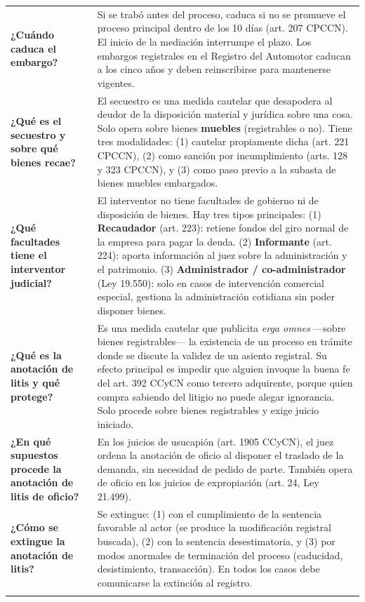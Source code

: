 \documentclass[12pt,oneside]{book}
\begin{document}
\begin{longtable}{p{} p{}}
\textbf{¿Cuándo caduca el embargo?} &
Si se trabó antes del proceso, caduca si no se promueve el proceso principal dentro de los 10 días (art. 207 CPCCN). El inicio de la mediación interrumpe el plazo. Los embargos registrales en el Registro del Automotor caducan a los cinco años y deben reinscribirse para mantenerse vigentes. \\
\addlinespace

\textbf{¿Qué es el secuestro y sobre qué bienes recae?} &
El secuestro es una medida cautelar que desapodera al deudor de la disposición material y jurídica sobre una cosa. Solo opera sobre bienes \textbf{muebles} (registrables o no). Tiene tres modalidades: (1) cautelar propiamente dicha (art. 221 CPCCN), (2) como sanción por incumplimiento (arts. 128 y 323 CPCCN), y (3) como paso previo a la subasta de bienes muebles embargados. \\
\addlinespace

\textbf{¿Qué facultades tiene el interventor judicial?} &
El interventor no tiene facultades de gobierno ni de disposición de bienes. Hay tres tipos principales: (1) \textbf{Recaudador} (art. 223): retiene fondos del giro normal de la empresa para pagar la deuda. (2) \textbf{Informante} (art. 224): aporta información al juez sobre la administración y el patrimonio. (3) \textbf{Administrador / co-administrador} (Ley 19.550): solo en casos de intervención comercial especial, gestiona la administración cotidiana sin poder disponer bienes. \\
\addlinespace

\textbf{¿Qué es la anotación de litis y qué protege?} &
Es una medida cautelar que publicita \textit{erga omnes} ---sobre bienes registrables--- la existencia de un proceso en trámite donde se discute la validez de un asiento registral. Su efecto principal es impedir que alguien invoque la buena fe del art. 392 CCyCN como tercero adquirente, porque quien compra sabiendo del litigio no puede alegar ignorancia. Solo procede sobre bienes registrables y exige juicio iniciado. \\
\addlinespace

\textbf{¿En qué supuestos procede la anotación de litis de oficio?} &
En los juicios de usucapión (art. 1905 CCyCN), el juez ordena la anotación de oficio al disponer el traslado de la demanda, sin necesidad de pedido de parte. También opera de oficio en los juicios de expropiación (art. 24, Ley 21.499). \\
\addlinespace

\textbf{¿Cómo se extingue la anotación de litis?} &
Se extingue: (1) con el cumplimiento de la sentencia favorable al actor (se produce la modificación registral buscada), (2) con la sentencia desestimatoria, y (3) por modos anormales de terminación del proceso (caducidad, desistimiento, transacción). En todos los casos debe comunicarse la extinción al registro. \\
\addlinespace


\end{longtable}
\end{document}
